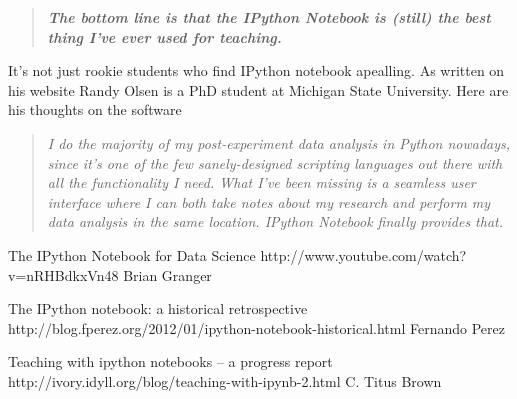 \documentclass[11pt, a4paper]{article}  %
\begin{document}
\begin{multicols}{2}
\begin{quote}
\textit{\textbf{The bottom line is that the IPython Notebook is (still) the
best thing I've ever used for teaching.}}
\end{quote}

It's not just rookie students who find IPython notebook apealling. As written on his website Randy Olsen is a PhD student at Michigan State University. Here are his thoughts on the software

\begin{quote}
\textit{I do the majority of my post-experiment data analysis in Python
nowadays, since it’s one of the few sanely-designed scripting languages out
there with all the functionality I need. What I’ve been missing is a seamless
user interface where I can both take notes about my research and perform my
data analysis in the same location. IPython Notebook finally provides that.}
\end{quote}









\end{multicols}

The IPython Notebook for Data Science 
http://www.youtube.com/watch?v=nRHBdkxVn48 
Brian Granger

The IPython notebook: a historical retrospective
http://blog.fperez.org/2012/01/ipython-notebook-historical.html
Fernando Perez

Teaching with ipython notebooks -- a progress report
http://ivory.idyll.org/blog/teaching-with-ipynb-2.html
C. Titus Brown
\end{document}
